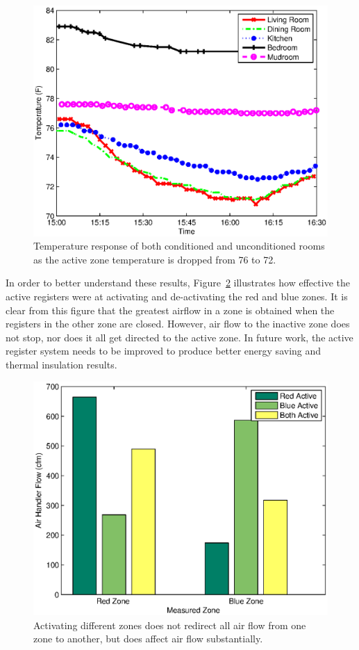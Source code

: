 \begin{figure}[ht]
  \centering
  \includegraphics[width=0.6\columnwidth]{fig/houseTempRes.eps}
  \caption[Temperature Response of Conditioned and Unconditioned
  Rooms]{Temperature response of both conditioned and unconditioned rooms as the
  active zone temperature is dropped from 76 to 72.}
  \label{fig:houseTempRes}
\end{figure}

In order to better understand these results, Figure~\ref{fig:airflowBar}
illustrates how effective the active registers were at activating and
de-activating the red and blue zones.  It is clear from this figure that the
greatest airflow in a zone is obtained when the registers in the other zone are
closed.  However, air flow to the inactive zone does not stop, nor does it all
get directed to the active zone. In future work, the active register system
needs to be improved to produce better energy saving and thermal insulation
results.

\begin{figure}[ht]
  \centering
  \includegraphics[width=0.6\columnwidth]{fig/airflowBar.eps}
  \caption[Effect of Zoning on Airflow]{Activating different zones does not
    redirect all air flow from one zone to another, but does affect air flow
    substantially.}
  \label{fig:airflowBar}
\end{figure}

